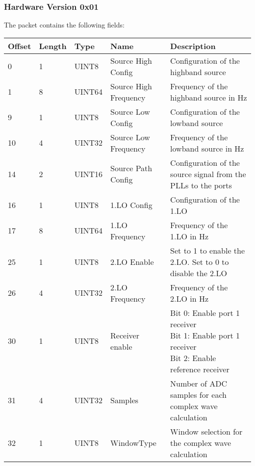 \documentclass[a4paper,11pt]{article}
\begin{document}
\subsubsection{Hardware Version 0x01}
The packet contains the following fields:
\begin{ThreePartTable}
\setlength\tabcolsep{3pt}

\begin{longtable}{p{} |  p{}  |  p{}| p{} | p{}}
\toprule
\textbf{Offset} &\textbf{Length} &\textbf{Type} & \textbf{Name} &\textbf{Description} \\ 
\hline
\endhead
\midrule[\heavyrulewidth]
\endfoot  
\midrule[\heavyrulewidth]
\endlastfoot

0 & 1 & UINT8 & Source High Config & Configuration of the highband source \\
1 & 8 & UINT64 & Source High Frequency & Frequency of the highband source in Hz \\
9 & 1 & UINT8 & Source Low Config & Configuration of the lowband source \\
10 & 4 & UINT32 & Source Low Frequency & Frequency of the lowband source in Hz \\
14 & 2 & UINT16 & Source Path Config & Configuration of the source signal from the PLLs to the ports \\
16 & 1 & UINT8 & 1.LO Config & Configuration of the 1.LO \\
17 & 8 & UINT64 & 1.LO Frequency & Frequency of the 1.LO in Hz \\
25 & 1 & UINT8 & 2.LO Enable & Set to 1 to enable the 2.LO. Set to 0 to disable the 2.LO \\
26 & 4 & UINT32 & 2.LO Frequency & Frequency of the 2.LO in Hz \\
\hline
30 & 1 & UINT8 & Receiver enable & \makecell[l]{Bit 0: Enable port 1 receiver\\Bit 1: Enable port 1 receiver\\Bit 2: Enable reference receiver} \\
\hline
31 & 4 & UINT32 & Samples & Number of ADC samples for each complex wave calculation \\
32 & 1 & UINT8 & WindowType & Window selection for the complex wave calculation \\
\end{longtable}   
\end{ThreePartTable}
\end{document}
